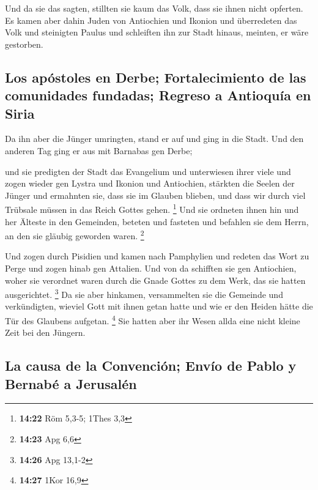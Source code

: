  Und da sie das sagten, stillten sie kaum das Volk, dass
sie ihnen nicht opferten.  Es kamen aber dahin Juden von
Antiochien und Ikonion und überredeten das Volk und steinigten Paulus
und schleiften ihn zur Stadt hinaus, meinten, er wäre gestorben.

\hypertarget{los-apuxf3stoles-en-derbe-fortalecimiento-de-las-comunidades-fundadas-regreso-a-antioquuxeda-en-siria}{%
\subsection{Los apóstoles en Derbe; Fortalecimiento de las comunidades
fundadas; Regreso a Antioquía en
Siria}\label{los-apuxf3stoles-en-derbe-fortalecimiento-de-las-comunidades-fundadas-regreso-a-antioquuxeda-en-siria}}

 Da ihn aber die Jünger umringten, stand er auf und ging
in die Stadt. Und den anderen Tag ging er aus mit Barnabas gen Derbe;

 und sie predigten der Stadt das Evangelium und
unterwiesen ihrer viele und zogen wieder gen Lystra und Ikonion und
Antiochien,  stärkten die Seelen der Jünger und ermahnten
sie, dass sie im Glauben blieben, und dass wir durch viel Trübsale
müssen in das Reich Gottes gehen. \footnote{\textbf{14:22} Röm 5,3-5;
  1Thes 3,3}  Und sie ordneten ihnen hin und her Älteste
in den Gemeinden, beteten und fasteten und befahlen sie dem Herrn, an
den sie gläubig geworden waren. \footnote{\textbf{14:23} Apg 6,6}

 Und zogen durch Pisidien und kamen nach Pamphylien
 und redeten das Wort zu Perge und zogen hinab gen
Attalien.  Und von da schifften sie gen Antiochien, woher
sie verordnet waren durch die Gnade Gottes zu dem Werk, das sie hatten
ausgerichtet. \footnote{\textbf{14:26} Apg 13,1-2}  Da
sie aber hinkamen, versammelten sie die Gemeinde und verkündigten,
wieviel Gott mit ihnen getan hatte und wie er den Heiden hätte die Tür
des Glaubens aufgetan. \footnote{\textbf{14:27} 1Kor 16,9}
 Sie hatten aber ihr Wesen allda eine nicht kleine Zeit
bei den Jüngern.

\hypertarget{la-causa-de-la-convenciuxf3n-envuxedo-de-pablo-y-bernabuxe9-a-jerusaluxe9n}{%
\subsection{La causa de la Convención; Envío de Pablo y Bernabé a
Jerusalén}\label{la-causa-de-la-convenciuxf3n-envuxedo-de-pablo-y-bernabuxe9-a-jerusaluxe9n}}

